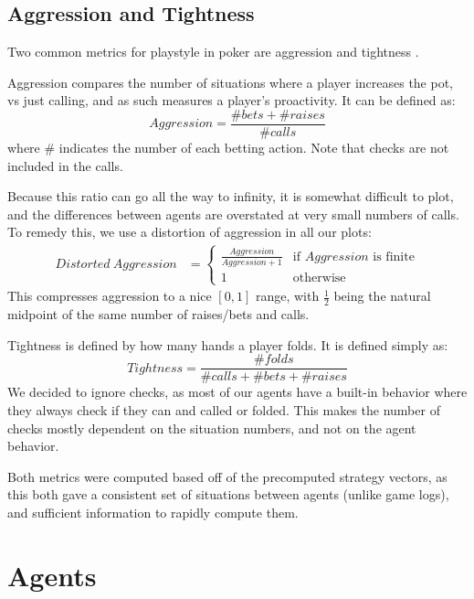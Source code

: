 \subsection{Aggression and Tightness}

Two common metrics for playstyle in poker are aggression and tightness \cite{PokerStrategy}.

Aggression compares the number of situations where a player increases the pot, vs just calling, and as such measures a player's proactivity. It can be defined as:
\begin{equation}
    Aggression = \frac{\# bets + \# raises}{\# calls}
\end{equation} where \# indicates the number of each betting action. Note that checks are not included in the calls.

Because this ratio can go all the way to infinity, it is somewhat difficult to plot, and the differences between agents are overstated at very small numbers of calls. To remedy this, we use a distortion of aggression in all our plots:
\begin{equation}
\begin{split}
Distorted\ Aggression &= \begin{cases}
\frac{Aggression}{Aggression + 1} &\mbox{if }Aggression\mbox{ is finite} \\
1 &\mbox{otherwise}
\end{cases}
\end{split}
\end{equation}
This compresses aggression to a nice $[0, 1]$ range, with $\frac{1}{2}$ being the natural midpoint of the same number of raises/bets and calls.

Tightness is defined by how many hands a player folds. It is defined simply as:
\begin{equation}
    Tightness = \frac{\# folds}{\# calls + \# bets + \# raises}
\end{equation}
We decided to ignore checks, as most of our agents have a built-in behavior where they always check if they can and called or folded. This makes the number of checks mostly dependent on the situation numbers, and not on the agent behavior.

Both metrics were computed based off of the precomputed strategy vectors, as this both gave a consistent set of situations between agents (unlike game logs), and sufficient information to rapidly compute them.
\section{Agents}

